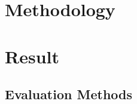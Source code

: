 \documentclass{ieeeojies}
\begin{document}
\section{Methodology}
 

\section{Result}
\subsection{Evaluation Methods}
\end{document}
